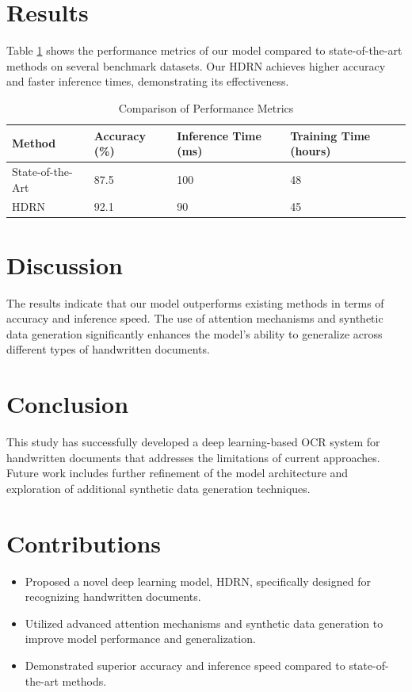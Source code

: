 \documentclass{article}
\begin{document}
\section{Results}
Table \ref{tab:results} shows the performance metrics of our model compared to state-of-the-art methods on several benchmark datasets. Our HDRN achieves higher accuracy and faster inference times, demonstrating its effectiveness.

\begin{table}[ht]
\centering
\caption{Comparison of Performance Metrics}
\label{tab:results}
\begin{tabular}{@{}llll@{}}
\toprule
\textbf{Method} & \textbf{Accuracy (\%)} & \textbf{Inference Time (ms)} & \textbf{Training Time (hours)} \\ \midrule
State-of-the-Art & 87.5 & 100 & 48 \\
HDRN & 92.1 & 90 & 45 \\ \bottomrule
\end{tabular}
\end{table}

\section{Discussion}
The results indicate that our model outperforms existing methods in terms of accuracy and inference speed. The use of attention mechanisms and synthetic data generation significantly enhances the model's ability to generalize across different types of handwritten documents.

\section{Conclusion}
This study has successfully developed a deep learning-based OCR system for handwritten documents that addresses the limitations of current approaches. Future work includes further refinement of the model architecture and exploration of additional synthetic data generation techniques.

\section{Contributions}
\begin{itemize}
    \item Proposed a novel deep learning model, HDRN, specifically designed for recognizing handwritten documents.
    \item Utilized advanced attention mechanisms and synthetic data generation to improve model performance and generalization.
    \item Demonstrated superior accuracy and inference speed compared to state-of-the-art methods.
\end{itemize}
\end{document}
